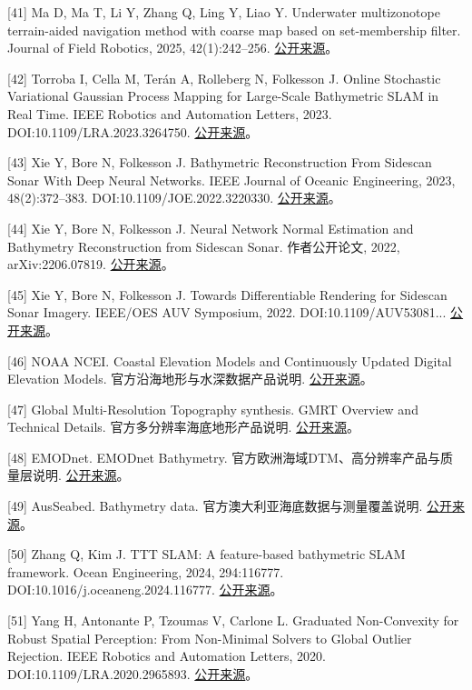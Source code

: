 {[}41{]} Ma D, Ma T, Li Y, Zhang Q, Ling Y, Liao Y. Underwater multizonotope terrain-aided navigation method with coarse map based on set-membership filter. Journal of Field Robotics, 2025, 42(1):242--256. \href{https://onlinelibrary.wiley.com/doi/abs/10.1002/rob.22407}{公开来源}。

{[}42{]} Torroba I, Cella M, Terán A, Rolleberg N, Folkesson J. Online Stochastic Variational Gaussian Process Mapping for Large-Scale Bathymetric SLAM in Real Time. IEEE Robotics and Automation Letters, 2023. DOI:10.1109/LRA.2023.3264750. \href{https://arxiv.org/abs/2211.05601}{公开来源}。

{[}43{]} Xie Y, Bore N, Folkesson J. Bathymetric Reconstruction From Sidescan Sonar With Deep Neural Networks. IEEE Journal of Oceanic Engineering, 2023, 48(2):372--383. DOI:10.1109/JOE.2022.3220330. \href{https://arxiv.org/abs/2206.07810}{公开来源}。

{[}44{]} Xie Y, Bore N, Folkesson J. Neural Network Normal Estimation and Bathymetry Reconstruction from Sidescan Sonar. 作者公开论文, 2022, arXiv:2206.07819. \href{https://arxiv.org/abs/2206.07819}{公开来源}。

{[}45{]} Xie Y, Bore N, Folkesson J. Towards Differentiable Rendering for Sidescan Sonar Imagery. IEEE/OES AUV Symposium, 2022. DOI:10.1109/\allowbreak AUV53081... \href{https://arxiv.org/abs/2206.07821}{公开来源}。

{[}46{]} NOAA NCEI. Coastal Elevation Models and Continuously Updated Digital Elevation Models. 官方沿海地形与水深数据产品说明. \href{https://www.ncei.noaa.gov/products/coastal-elevation-models}{公开来源}。

{[}47{]} Global Multi-Resolution Topography synthesis. GMRT Overview and Technical Details. 官方多分辨率海底地形产品说明. \href{https://gmrt.org/about/index.php}{公开来源}。

{[}48{]} EMODnet. EMODnet Bathymetry. 官方欧洲海域DTM、高分辨率产品与质量层说明. \href{https://emodnet.ec.europa.eu/en/bathymetry}{公开来源}。

{[}49{]} AusSeabed. Bathymetry data. 官方澳大利亚海底数据与测量覆盖说明. \href{https://www.ausseabed.gov.au/data/bathymetry}{公开来源}。

{[}50{]} Zhang Q, Kim J. TTT SLAM: A feature-based bathymetric SLAM framework. Ocean Engineering, 2024, 294:116777. DOI:10.1016/j.oceaneng.2024.116777. \href{https://www.sciencedirect.com/science/article/pii/S0029801824001148}{公开来源}。

{[}51{]} Yang H, Antonante P, Tzoumas V, Carlone L. Graduated Non-Convexity for Robust Spatial Perception: From Non-Minimal Solvers to Global Outlier Rejection. IEEE Robotics and Automation Letters, 2020. DOI:10.1109/LRA.2020.2965893. \href{https://arxiv.org/abs/1909.08605}{公开来源}。

